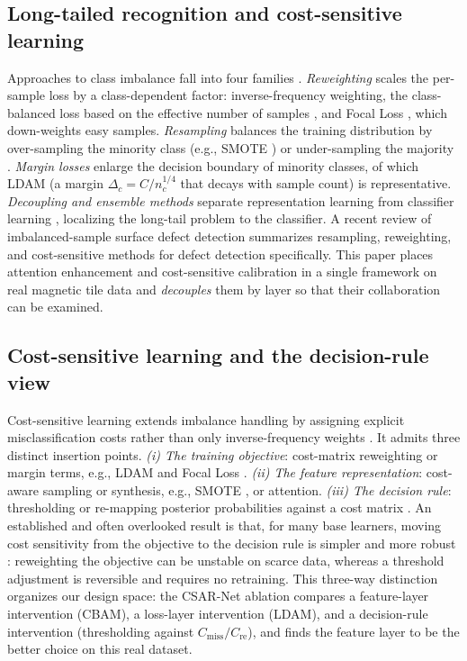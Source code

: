 \documentclass[a4paper,fleqn]{cas-sc}
\begin{document}
\begin{sloppypar}
	\subsection{Long-tailed recognition and cost-sensitive learning}
	\par{
		Approaches to class imbalance fall into four families \citep{zhang2023deep}. \emph{Reweighting} scales the per-sample loss by a class-dependent factor: inverse-frequency weighting, the class-balanced loss based on the effective number of samples \citep{cui2019class}, and Focal Loss \citep{lin2017focal}, which down-weights easy samples. \emph{Resampling} balances the training distribution by over-sampling the minority class (e.g., SMOTE \citep{chawla2002smote}) or under-sampling the majority \citep{drummond2003c4}. \emph{Margin losses} enlarge the decision boundary of minority classes, of which LDAM \citep{cao2019learning} (a margin $\Delta_c=C/n_c^{1/4}$ that decays with sample count) is representative. \emph{Decoupling and ensemble methods} separate representation learning from classifier learning \citep{kang2020decoupling}, localizing the long-tail problem to the classifier. A recent review of imbalanced-sample surface defect detection \citep{bai2024surface} summarizes resampling, reweighting, and cost-sensitive methods for defect detection specifically. This paper places attention enhancement and cost-sensitive calibration in a single framework on real magnetic tile data and \emph{decouples} them by layer so that their collaboration can be examined.
	}

	\subsection{Cost-sensitive learning and the decision-rule view}
	\par{
		Cost-sensitive learning extends imbalance handling by assigning explicit misclassification costs rather than only inverse-frequency weights \citep{elkan2001cost,he2009learning}. It admits three distinct insertion points. \emph{(i) The training objective}: cost-matrix reweighting or margin terms, e.g., LDAM \citep{cao2019learning} and Focal Loss \citep{lin2017focal}. \emph{(ii) The feature representation}: cost-aware sampling or synthesis, e.g., SMOTE \citep{chawla2002smote}, or attention. \emph{(iii) The decision rule}: thresholding or re-mapping posterior probabilities against a cost matrix \citep{provost1997cost,elkan2001cost}. An established and often overlooked result is that, for many base learners, moving cost sensitivity from the objective to the decision rule is simpler and more robust \citep{drummond2003c4,elkan2001cost}: reweighting the objective can be unstable on scarce data, whereas a threshold adjustment is reversible and requires no retraining. This three-way distinction organizes our design space: the CSAR-Net ablation compares a feature-layer intervention (CBAM), a loss-layer intervention (LDAM), and a decision-rule intervention (thresholding against $C_{\text{miss}}/C_{\text{re}}$), and finds the feature layer to be the better choice on this real dataset.
	}


\end{sloppypar}
\end{document}

